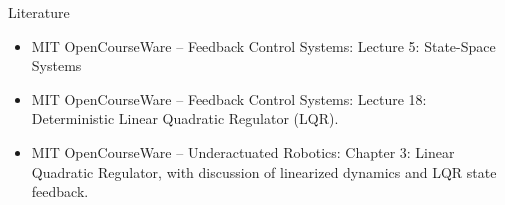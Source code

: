 \documentclass{beamer}
\begin{document}
\begin{frame}{Literature}

\begin{itemize}
	
	
	\item MIT OpenCourseWare -- Feedback Control Systems: 
	{Lecture 5: State-Space Systems}
	
	\item MIT OpenCourseWare -- Feedback Control Systems: 
	{Lecture 18: Deterministic Linear Quadratic Regulator (LQR).}
	
	\item MIT OpenCourseWare -- Underactuated Robotics: 
	{Chapter 3: Linear Quadratic Regulator, with discussion of linearized dynamics and LQR state feedback.}
	
\end{itemize}


\end{frame}



\myqrframe
\end{document}
